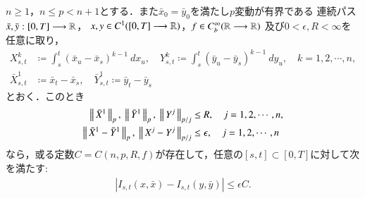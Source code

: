 	\begin{screen}
		\begin{thm}[連続性定理の拡張]
			$n \geq 1$，$n \leq p < n+1$とする．また$\bar{x}_0 = \bar{y}_0$を満たし$p$変動が有界である
			連続パス$\bar{x},\bar{y}:[0,T] \longrightarrow \mathbb{R}$，
			$x,y \in C^1([0,T] \longrightarrow \mathbb{R})$，$f \in C^\infty_b(\mathbb{R} \longrightarrow \mathbb{R})$\footnotemark
			及び$0 < \epsilon ,R < \infty$を任意に取り，
			\begin{align}
				X^k_{s,t} &\coloneqq \int_s^t (\bar{x}_u - \bar{x}_s)^{k-1}\ dx_u,
				\quad Y^k_{s,t} \coloneqq \int_s^t (\bar{y}_u - \bar{y}_s)^{k-1}\ dy_u,
				\quad k=1,2,\cdots,n, \\
				\bar{X}^1_{s,t} &\coloneqq \bar{x}_t - \bar{x}_s,
				\quad \bar{Y}^1_{s,t} \coloneqq \bar{y}_t - \bar{y}_s
			\end{align}
			とおく．このとき
			\begin{align}
				\Norm{\bar{X}^1}{p},\ \Norm{\bar{Y}^1}{p},\ \Norm{Y^j}{p/j} &\leq R,
				\quad j=1,2,\cdots,n, \\
				\Norm{\bar{X}^1 - \bar{Y}^1}{p},\ \Norm{X^j - Y^j}{p/j} &\leq \epsilon,
				\quad j=1,2,\cdots,n
			\end{align}
			なら，或る定数$C = C(n,p,R,f)$が存在して，任意の$[s,t] \subset [0,T]$に対して次を満たす:
			\begin{align}
				\left| I_{s,t}(x,\bar{x}) - I_{s,t}(y,\bar{y}) \right| \leq \epsilon C.
			\end{align}
		\end{thm}
	\end{screen}
